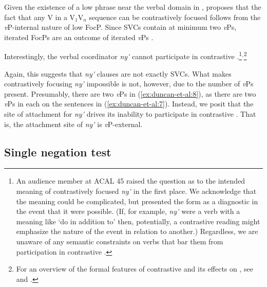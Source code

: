 \documentclass[output=paper,modfonts,nonflat,
colorlinks, citecolor=brown,
draftmode
]{langsci/langscibook}
\begin{document}
\noindent Given the existence of a low  phrase near the verbal domain in  \citep{duncan-toappear}, \citet{duncan2016parallel} proposes that the fact that any V in a V$_1$V$_n$ sequence can be contrastively focused follows from the \textit{v}P-internal nature of low FocP. Since SVCs contain at minimum two \textit{v}Ps, iterated FocPs are an outcome of iterated \textit{v}Ps \citep[98-100]{duncan2016parallel}. 

Interestingly, the verbal coordinator \textit{ny\'{\textturnv}\ng} cannot participate in contrastive .\footnote{An audience member at ACAL 45 raised the question as to the intended meaning of contrastively focused \textit{ny\'{\textturnv}\ng} in the first place. We acknowledge that the meaning could be complicated, but presented the form as a diagnostic in the event that it were possible. (If, for example, \textit{ny\'{\textturnv}\ng} were a verb with a meaning like `do in addition to' then, potentially, a contrastive  reading might emphasize the nature of the event in relation to another.) Regardless, we are unaware of any semantic constraints on verbs that bar them from participation in contrastive .}$^,$\footnote{For an overview of the formal features of  contrastive  and its effects on , see \citet{akinlabi2003} and \citet{duncan-toappear}.}


 \label{ex:duncan-et-al:8}
\z

\noindent Again, this suggests that \textit{ny\'{\textturnv}\ng} clauses are not exactly SVCs. What makes contrastively focusing \textit{ny\'{\textturnv}\ng} impossible is not, however, due to the number of \textit{v}Ps present. Presumably, there are two \textit{v}Ps in (\ref{ex:duncan-et-al:8}), as there are two \textit{v}Ps in each on the sentences in (\ref{ex:duncan-et-al:7}). Instead, we posit that the site of attachment for \textit{ny\'{\textturnv}\ng} drives its inability to participate in contrastive . That is, the attachment site of \textit{ny\'{\textturnv}\ng} is \textit{v}P-external.

\subsection{Single negation test}\label{sec:duncan-et-al:2.3}
\end{document}
